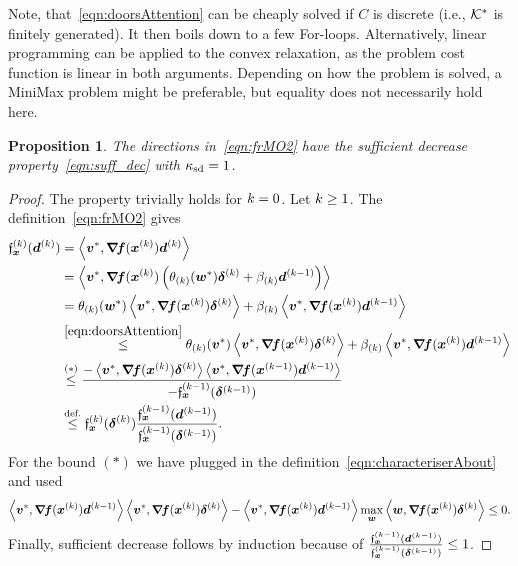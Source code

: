 \documentclass{article}
\theoremstyle{plain}
\newtheorem{proposition}[theorem]{Proposition}
\theoremstyle{definition}
\begin{document}
Note, that~\eqref{eqn:doorsAttention} can be cheaply solved if $C$ is discrete 
(i.e., $\mathcal K^*$ is finitely generated).
It then boils down to a few For-loops.
Alternatively, linear programming can be applied to the convex relaxation, 
as the problem cost function is linear in both arguments.
Depending on how the problem is solved, a MiniMax problem might be preferable,
but equality does not necessarily hold here.

\begin{proposition}
	The directions in~\eqref{eqn:frMO2} have the 
	sufficient decrease property~\eqref{eqn:suff_dec}
	with $\kappa_{\mathrm{sd}} = 1$.
\end{proposition}

\begin{proof}
	The property trivially holds for $k=0$.
	Let $k \geq 1$.
	The definition~\eqref{eqn:frMO2}
	gives
	\begin{align*}
		\funcXK(\vdK)
		&=
		\mul{\ve{v}^*}{\jacf(\vxK) \vdK}
		\\
		&=
		\mul{\ve{v}^*}{\jacf(\vxK)
		\args{
			\theta\kK(\ve w^*)
			\sdK
			+
			\beta\kK
			\vdKp
		}}
		\\
		&=
		\theta\kK(\ve w^*)
		\mul{\ve{v}^*}{\jacf(\vxK)\sdK}
		+
		\beta\kK
		\mul{\ve{v}^*}{\jacf(\vxK)\vdKp}
		\\
		&\stackrel{\eqref{eqn:doorsAttention}}\leq
		\theta\kK(\ve v^*)
		\mul{\ve{v}^*}{\jacf(\vxK)\sdK}
		+
		\beta\kK
		\mul{\ve{v}^*}{\jacf(\vxK)\vdKp}
		\\
		&\stackrel{(*)}\leq
		\frac{-
		\mul{\ve{v}^*}{\jacf(\vxK)\sdK}
		\mul{\ve v^*}{\jacf(\vxKp)\vdKp}
		}{
			-\funcXKp(\sdKp)
		}
		\\
		&\stackrel{\text{def.}}\leq
		\funcXK(\sdK)
		\frac{
			\funcXKp(\vdKp)
		}{
			\funcXKp(\sdKp)
		}
		.
	\end{align*}
	For the bound $(*)$ we have plugged in the 
	definition~\eqref{eqn:characteriserAbout} and used
	$$
	\left\langle \bm{v}^*, \bm{\nabla}\!\bm{f}(\bm{x}^{(k)})\bm{d}^{(k-1)} \right\rangle
	\left\langle \bm{v}^*, \bm{\nabla}\!\bm{f}(\bm{x}^{(k)})\bm{\delta}^{(k)} \right\rangle
	-
	\left\langle \bm{v}^*, \bm{\nabla}\!\bm{f}(\bm{x}^{(k)})\bm{d}^{(k-1)} \right\rangle
	\max_{\bm{w}}\left\langle \bm{w}, \bm{\nabla}\!\bm{f}(\bm{x}^{(k)})\bm{\delta}^{(k)} \right\rangle
	\leq 0.
	$$
	Finally, sufficient decrease follows by induction
	because of $\frac{\mathfrak{f}_{\bm{x}}^{(k-1)}(\bm{d}^{(k-1)})}{\mathfrak{f}_{\bm{x}}^{(k-1)}(\bm{\delta}^{(k-1)})}\leq 1$.
\end{proof}
\end{document}
